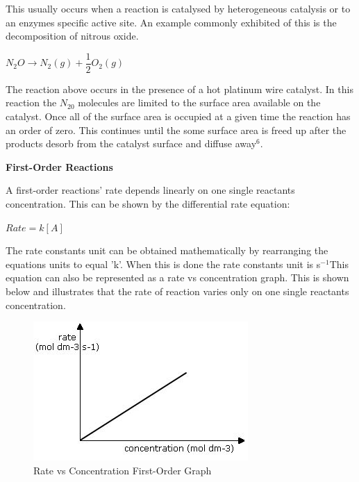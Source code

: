 This usually occurs when a reaction is catalysed by heterogeneous catalysis or to an enzymes specific active site. An example commonly exhibited of this is the decomposition of nitrous oxide.

$N_2O \rightarrow N_2(g) + \dfrac{1}{2} O_2(g)$

The reaction above occurs in the presence of a hot platinum wire catalyst. In this reaction the $N_20$ molecules are limited to the surface area available on the catalyst. Once all of the surface area is occupied at a given time the reaction has an order of zero. This continues until the some surface area is freed up after the products desorb from the catalyst surface and diffuse away$^6$.



\textbf{First-Order Reactions}

A first-order reactions' rate depends linearly on one single reactants concentration. This can be shown by the differential rate equation:

$Rate = k[A]$

The rate constants unit can be obtained mathematically by rearranging the equations units to equal 'k'. When this is done the rate constants unit is s$^{-1}$This equation can also be represented as a rate vs concentration graph. This is shown below and illustrates that the rate of reaction varies only on one single reactants concentration.


\begin{figure}[H]
    \includegraphics[width=\textwidth]{./Planning/Images/FirstOrder.jpg}
    \caption{ Rate vs Concentration First-Order Graph} \label{fig:First Order Graph}
\end{figure}

